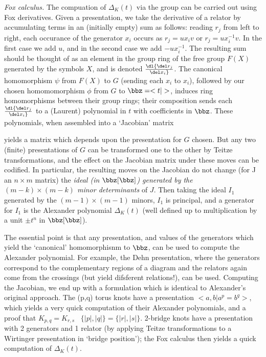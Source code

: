 \ssk

{\it Fox calculus.} The compuation of $\Delta_K(t)$ via the group can be carried out using Fox 
derivatives. Given a presentation, we take the derivative of a relator by accumulating terms in an 
(initially empty) sum as follows: reading $r_j$ from left
to right, each occurance of the generator $x_i$ occurs as
$r_j=ux_iv$ or $r_j=ux_i^{-1}v$. In the first case we add $u$, and in the 
second case we add $-ux_i^{-1}$. The resulting sum should be thought of
as an element in the group ring of the free group $F(X)$ generated by
the symbols $X$, and is denoted $\dl {{\del r_j}\over{\del x_i}}$. 
The canonical homomorphism $\psi$ from $F(X)$ to $G$ (sending each $x_i$ to $x_i$),
followed by our chosen homomomorphism $\phi$ from $G$ to $\bbz=<t|>$, induces ring
homomorphisms between their group rings; their composition sends each
$\dl {{\del r_j}\over{\del x_i}}$ to a (Laurent) polynomial in $t$ with
coefficients in $\bbz$. 
These polynomials, when assembled into a `Jacobian' matrix

\ssk


\ssk

yields a matrix which depends 
upon the presentation for $G$ chosen. But any two (finite) presentations of $G$ can
be transformed one to the other by Teitze transformations, and the effect on 
the Jacobian matrix under these moves can be codified. In particular, the 
resulting moves on the Jacobian do not change (for J an $n\times m$ matrix)
the {\it ideal (in $\bbz[\bbz]$) generated by the 
$(m-k)\times(m-k)$ minor determinants} of $J$. Then taking the
ideal $I_1$ generated by the $(m-1)\times(m-1)$ minors, $I_1$ is principal,
and a generator for $I_1$ is the Alexander polynomial $\Delta_K(t)$ (well defined up
to multiplication by a unit $\pm t^n$ in $\bbz[\bbz]$).

\ssk

The essential point is that any presentation, and values of the generators which yield the
`canonical' homomorphisnm to $\bbz$, can be used to compute the Alexander polynomial.
For example, the Dehn presentation, where the generators correspond to the 
complementary regions of a diagram and the relators again come from the crossings (but 
yield difsferent relations!), can be used. Computing the Jacobian, we end up with 
a formulation which is identical to Alexander's original approach. 
The (p,q) torus knots have a presentation $<a,b | a^p=b^q>$, which yields
a very quick computation of their Alexander polynomials, and a proof that $K_{p,q}=K_{r,s}$
\lra\ $\{|p|,|q|\}=\{|r|,|s|\}$. 2-bridge knots have a presentation with 2 generators and
1 relator (by applying Teitze transformations to a Wirtinger presentation in `bridge
position'); the Fox calculus then yields a quick computation of $\Delta_K(t)$.

